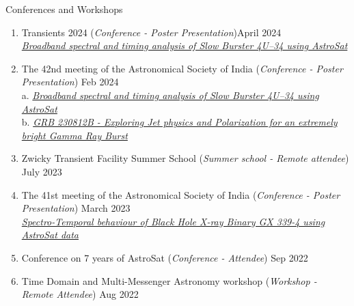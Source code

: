 \begin{rSection}{Conferences and Workshops} 
\begin{enumerate}[itemsep=-0.5em, leftmargin=0.5em]
    \item Transients 2024 (\textit{Conference - Poster Presentation})\hfill April 2024 \\ 
    \href{https://www.dropbox.com/scl/fi/aw33s2tmk6wsrwwbju25e/ASI-2024-poster.pdf?rlkey=aiasm86d2e3t40235q0knu635&st=3qr65pz8&dl=0}{\textit{Broadband spectral and timing analysis of Slow Burster 4U--34 using AstroSat}}

    \item The 42nd meeting of the Astronomical Society of India (\textit{Conference - Poster Presentation}) \hfill Feb 2024 \\ 
    a. \href{https://www.dropbox.com/scl/fi/aw33s2tmk6wsrwwbju25e/ASI-2024-poster.pdf?rlkey=aiasm86d2e3t40235q0knu635&st=3qr65pz8&dl=0}{\textit{Broadband spectral and timing analysis of Slow Burster 4U--34 using AstroSat}} \\ 
    b. \href{https://www.dropbox.com/scl/fi/070gc2spxxeulyyuaau4u/GRB-230812B-ASI-Poster.pdf?rlkey=6mxxyuahft6bxbib6txfyoto4&st=k1wjpe8d&dl=0}{\textit{GRB 230812B - Exploring Jet physics and Polarization for an extremely bright Gamma Ray Burst}}

    \item Zwicky Transient Facility Summer School (\textit{Summer school - Remote attendee}) \hfill July 2023

    \item The 41st meeting of the Astronomical Society of India (\textit{Conference - Poster Presentation}) \hfill March 2023 \\ 
    \href{https://www.dropbox.com/scl/fi/2vxerkx3lhnbb6bgwactw/ASI-2023-Poster.pdf?rlkey=1hyjudte4bn1xf4sks47nb0c5&st=lc2jnnm0&dl=0}{\textit{Spectro-Temporal behaviour of Black Hole X-ray Binary GX 339-4 using AstroSat data}}

    \item Conference on 7 years of AstroSat (\textit{Conference - Attendee}) \hfill Sep 2022

    \item Time Domain and Multi-Messenger Astronomy workshop (\textit{Workshop - Remote Attendee}) \hfill Aug 2022
\end{enumerate}
\end{rSection}
